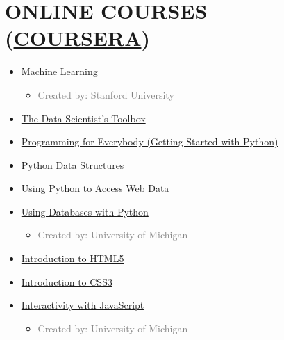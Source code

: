 \documentclass[10pt,a4paper,sans]{moderncv} %
\begin{document}
\section{ONLINE COURSES (\href{http://www.coursera.com}{COURSERA})}
\begin{itemize}
	\item {}  \href{https://www.coursera.org/learn/machine-learning}{Machine Learning}
	\begin{itemize}
		\item \textcolor{gray}{Created by: Stanford University}
	\end{itemize}
	
	\item  {}  \href{https://www.coursera.org/learn/data-scientists-tools}{The Data Scientist's Toolbox} 

	\item {} \href{https://www.coursera.org/learn/python}{Programming for Everybody (Getting Started with Python)} 
	
	\item  {} \href{https://www.coursera.org/learn/python-data}{Python Data Structures}  
	
	\item {}  \href{https://www.coursera.org/learn/python-network-data}{Using Python to Access Web Data} 
	
	\item  {} \href{https://www.coursera.org/learn/python-databases}{Using Databases with Python}  
	\begin{itemize}
		\item \textcolor{gray}{Created by: University of Michigan}
	\end{itemize}

	\item  {} \href{https://www.coursera.org/learn/html}{Introduction to HTML5} 
	
	\item  {} \href{https://www.coursera.org/learn/introcss}{Introduction to CSS3} 
	
	\item  {} \href{https://www.coursera.org/learn/javascript}{Interactivity with JavaScript}  
	\begin{itemize}
		\item \textcolor{gray}{Created by: University of Michigan}
	\end{itemize}

\end{itemize}
\end{document}
